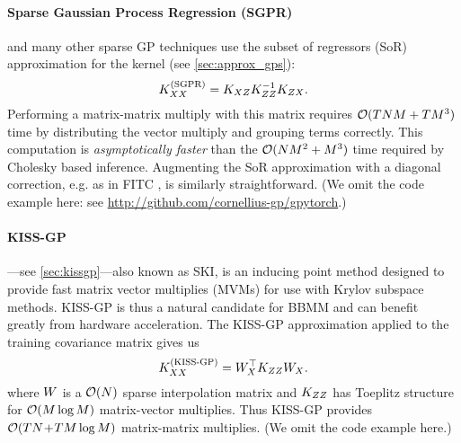 \paragraph{Sparse Gaussian Process Regression (SGPR)}
\cite{titsias2009variational} and many other sparse GP techniques \cite{quinonero2005unifying,snelson2006sparse,hensman2013gaussian} use the subset of regressors (SoR) approximation for the kernel (see \cref{sec:approx_gps}):
\[
  K_{XX}^{(\text{SGPR})} = K_{XZ} K_{ZZ}^{-1} K_{ZX}.
\]
Performing a matrix-matrix multiply with this matrix requires $\bigo{TNM + TM^{3}}$ time by distributing the vector multiply and grouping terms correctly.
This computation is \emph{asymptotically faster} than the $\bigo{NM^{2} + M^{3}}$ time required by Cholesky based inference.
Augmenting the SoR approximation with a diagonal correction, e.g. as in FITC \cite{snelson2006sparse}, is similarly straightforward.
(We omit the code example here: see \url{http://github.com/cornellius-gp/gpytorch}.)

\paragraph{KISS-GP}
\cite{wilson2015kernel}---see \cref{sec:kissgp}---also known as SKI, is an inducing point method designed to provide fast matrix vector multiplies (MVMs) for use with Krylov subspace methods.
KISS-GP is thus a natural candidate for BBMM and can benefit greatly from hardware acceleration.
The KISS-GP approximation applied to the training covariance matrix gives us
\[
  K_{XX}^{(\text{KISS-GP})} = W_{X}^\top K_{ZZ} W_{X}.
\]
where $W$ is a $\bigo{N}$ sparse interpolation matrix and $K_{ZZ}$ has Toeplitz structure for $\bigo{M \log M}$ matrix-vector multiplies.
Thus KISS-GP provides $\bigo{TN \! + \! TM \log M}$ matrix-matrix multiplies.
(We omit the code example here.)



